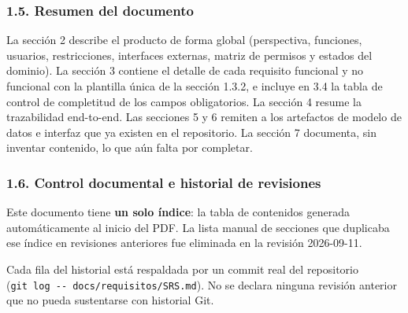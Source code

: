 \documentclass[
  spanish,
]{article}
\begin{document}
\subsubsection{1.5. Resumen del documento}\label{resumen-del-documento}

La sección 2 describe el producto de forma global (perspectiva,
funciones, usuarios, restricciones, interfaces externas, matriz de
permisos y estados del dominio). La sección 3 contiene el detalle de
cada requisito funcional y no funcional con la plantilla única de la
sección 1.3.2, e incluye en 3.4 la tabla de control de completitud de
los campos obligatorios. La sección 4 resume la trazabilidad end-to-end.
Las secciones 5 y 6 remiten a los artefactos de modelo de datos e
interfaz que ya existen en el repositorio. La sección 7 documenta, sin
inventar contenido, lo que aún falta por completar.

\subsubsection{1.6. Control documental e historial de
revisiones}\label{control-documental-e-historial-de-revisiones}

Este documento tiene \textbf{un solo índice}: la tabla de contenidos
generada automáticamente al inicio del PDF. La lista manual de secciones
que duplicaba ese índice en revisiones anteriores fue eliminada en la
revisión 2026-09-11.

Cada fila del historial está respaldada por un commit real del
repositorio (\texttt{git\ log\ -\/-\ docs/\allowbreak{}requisitos/\allowbreak{}SRS.\allowbreak{}md}). No se
declara ninguna revisión anterior que no pueda sustentarse con historial
Git.
\end{document}
